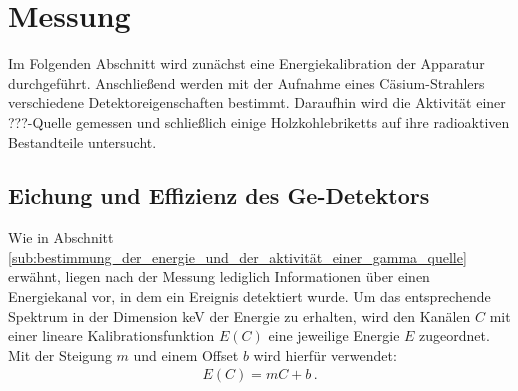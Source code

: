 \section{Messung}
\label{sec:messung}
Im Folgenden Abschnitt wird zunächst eine Energiekalibration der Apparatur
durchgeführt. Anschließend werden mit der Aufnahme eines Cäsium-Strahlers
verschiedene Detektoreigenschaften bestimmt.
Daraufhin wird die Aktivität einer ???-Quelle gemessen und schließlich einige
Holzkohlebriketts auf ihre radioaktiven Bestandteile untersucht.

\subsection{Eichung und Effizienz des Ge-Detektors}
\label{subse:eichung}
Wie in Abschnitt \ref{sub:bestimmung_der_energie_und_der_aktivität_einer_gamma_quelle} erwähnt, liegen nach der Messung lediglich Informationen über einen Energiekanal vor, in dem ein Ereignis detektiert wurde.
Um das entsprechende Spektrum in der Dimension \si{keV} der Energie zu erhalten, wird den Kanälen $C$ mit einer lineare Kalibrationsfunktion $E(C)$ eine jeweilige Energie $E$ zugeordnet.
Mit der Steigung $m$ und einem Offset $b$ wird hierfür verwendet:%
%
\begin{align}
    \label{eqn:kalibration}
    E(C) = mC + b\,.
\end{align}

